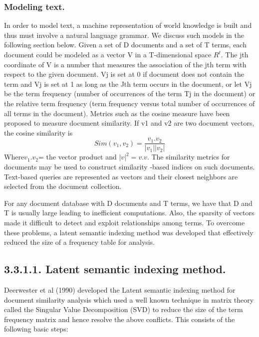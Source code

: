 \documentclass{article}
\begin{document}
\subsubsection{ Modeling text.}
In order to model text, a machine representation of world knowledge is built and thus must involve a natural language grammar. We discuss such models in the following section below.
        Given a set of D documents and a set of T terms, each document could be modeled as a vector V in a T-dimensional space $R^{t}$. 
The jth coordinate of V is a number that measures the association of the jth term with respect to the given document. Vj is set at 0 if document does not contain the term and Vj is set at 1 as long as the Jth term occurs in the document, or let Vj be the term frequency (number of occurrences of the term Tj in the document) or the relative term frequency (term frequency versus total number of occurrences of all terms in the document).
Metrics such as the cosine measure have been proposed to measure document similarity. If v1 and v2 are two document vectors, the cosine similarity is    
 \begin{equation}Sim(v_{1},v_{2}) = \frac{v_{1}.v_{2}}{|v_{1}||v_{2}|} \end{equation}
Where$ v_{1}.v_{2}$= the vector product and $|v|^{2} = v.v.$
\newline The similarity metrics for documents may be used to construct similarity -based indices on such documents. Text-based queries are represented as vectors and their closest neighbors are selected from the document collection.

For any document database with D documents and T terms, we have that D and T is usually large leading to inefficient computations. Also, the sparsity of vectors made it difficult to detect and exploit relationships among terms. To overcome these problems, a latent semantic indexing method was developed that effectively reduced the size of a frequency table for analysis.
\subsection*{3.3.1.1. Latent semantic indexing method.}
Deerwester et al (1990) developed the Latent semantic indexing method for document similarity analysis which used a well known technique in matrix theory called the Singular Value Decomposition (SVD) to reduce the size of the term frequency matrix and hence resolve the above conflicts. 
This consists of the following basic steps: 
\end{document}
